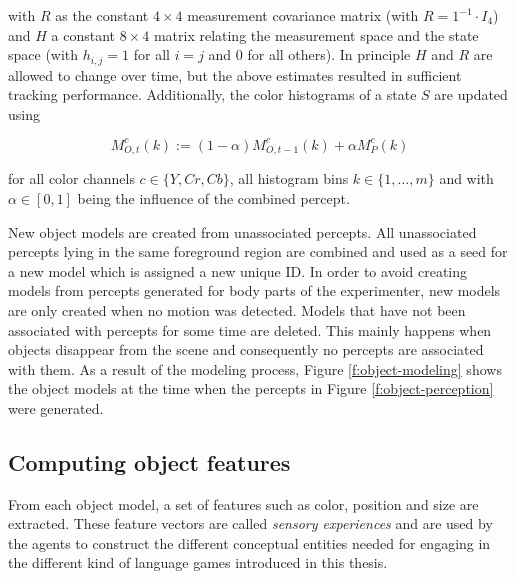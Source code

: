 \noindent with $R$ as the constant $4\times4$ measurement covariance
matrix (with $R=1^{-1}\cdot I_4$) and $H$ a constant $8\times4$ matrix
relating the measurement space and the state space (with $h_{i,j}=1$
for all $i=j$ and $0$ for all others). In principle $H$ and $R$ are
allowed to change over time, but the above estimates resulted in
sufficient tracking performance.  Additionally, the color histograms
of a state $S$ are updated using

$$M^c_{O,t}(k):=(1-\alpha) M^c_{O,t-1}(k)+\alpha M^c_{P}(k)$$

\noindent for all color channels $c\in\{Y,Cr,Cb\}$, all histogram bins
$k\in\{1,\dots,m\}$ and with $\alpha \in [0,1]$ being the influence
of the combined percept.

New object models are created from unassociated percepts. All
unassociated percepts lying in the same foreground region are combined
and used as a seed for a new model which is assigned a new
unique ID.  In order to avoid creating models from percepts generated
for body parts of the experimenter, new models are only created when
no motion was detected. Models that have not been associated
with percepts for some time are deleted. This mainly happens when
objects disappear from the scene and consequently no percepts are
associated with them. As a result of the modeling process, Figure
\ref{f:object-modeling} shows the object models at the time when the
percepts in Figure \ref{f:object-perception} were generated.


\subsection{Computing object features}
\label{s:computing-object-features}

From each object model, a set of features such as color, position and
size are extracted. These feature vectors are called \emph{sensory
  experiences} and are used by the agents to construct the different
conceptual entities needed for engaging in the different kind of
language games introduced in this thesis.

